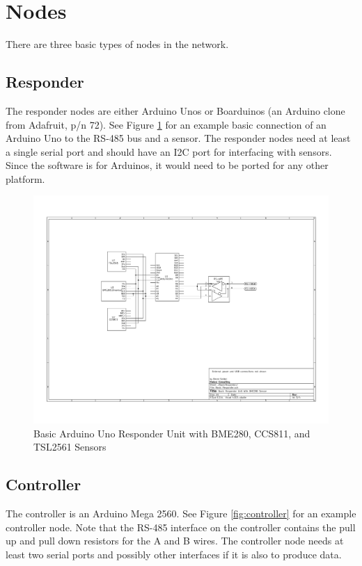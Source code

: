 \documentclass[10pt]{article}
\begin{document}
\section{Nodes}
There are three basic types of nodes in the network.

\subsection{Responder}
The responder nodes are either Arduino Unos or Boarduinos (an Arduino clone from Adafruit, p/n 72).  See Figure \ref{fig:basic} for an example basic connection of an Arduino Uno to the RS-485 bus and a sensor.  The responder nodes need at least a single serial port and should have an I2C port for interfacing with sensors.  Since the software is for Arduinos, it would need to be ported for any other platform.

\begin{figure}
  \centering
  \includegraphics[width=\textwidth]{ResponderUnit.pdf}
  \caption{Basic Arduino Uno Responder Unit with BME280, CCS811, and TSL2561 Sensors}
  \label{fig:basic}
\end{figure}

\subsection{Controller}
The controller is an Arduino Mega 2560.  See Figure \ref{fig:controller} for an example controller node.  Note that the RS-485 interface on the controller contains the pull up and pull down resistors for the A and B wires.  The controller node needs at least two serial ports and possibly other interfaces if it is also to produce data.
\end{document}
